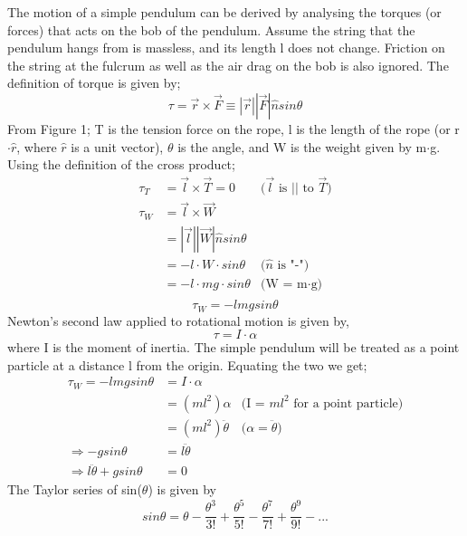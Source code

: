 \documentclass[iop]{emulateapj}
\begin{document}
The motion of a simple pendulum can be derived by analysing the torques (or forces) that acts 
on the bob of the pendulum. Assume the string that the pendulum hangs from is massless, and
its length l does not change. Friction on the string at the fulcrum as well as the
air drag on the bob is also ignored. The definition of torque is given by;
\begin{equation}
\boxed{\tau = \vec{r} \times \vec{F} \equiv |\vec{r}||\vec{F}|\hat{n}sin\theta}
\end{equation}
From Figure 1; T is the tension force on the rope, l is the length of the
rope (or r$\cdot\hat{r}$, where $\hat{r}$ is a unit vector), $\theta$ is the angle, and W is the weight given by m$\cdot$g.
Using the definition of the cross product;
\begin{align*}
\tau_T & = \vec{l} \times \vec{T} = 0 & \text{($\vec{l}$ is $||$ to $\vec{T}$)}\\
\tau_W & = \vec{l} \times \vec{W}\\
& = |\vec{l}||\vec{W}|\hat{n}sin\theta\\
& = -l\cdot W\cdot sin\theta & \text{($\hat{n}$ is "-")}\\
& = -l\cdot mg\cdot sin\theta & \text{(W = m$\cdot$g)}\\
\end{align*}
\begin{equation}
\boxed{\tau_W = -lmgsin\theta}
\end{equation}
Newton's second law applied to rotational motion is given by,
\begin{equation}
\tau = I\cdot\alpha
\end{equation}
where I is the moment of inertia. The simple pendulum will be 
treated as a point particle at a distance l from the origin.
Equating the two we get;
\begin{align*}
\tau_W = -lmgsin\theta & = I\cdot\alpha\\
& = (ml^2)\alpha & \text{(I = $ml^2$ for a point particle)}\\
& = (ml^2)\ddot{\theta} & \text{($\alpha = \ddot{\theta}$)}\\
\Rightarrow -gsin\theta & = l\ddot{\theta}\\
\Rightarrow l\ddot{\theta} + gsin\theta & = 0
\end{align*}
The Taylor series of sin($\theta$) is given by
\begin{equation}
\boxed{sin\theta = \theta - \frac{\theta^3}{3!} + \frac{\theta^5}{5!} - \frac{\theta^7}{7!} + \frac{\theta^9}{9!} - ...}
\end{equation}
\end{document}

